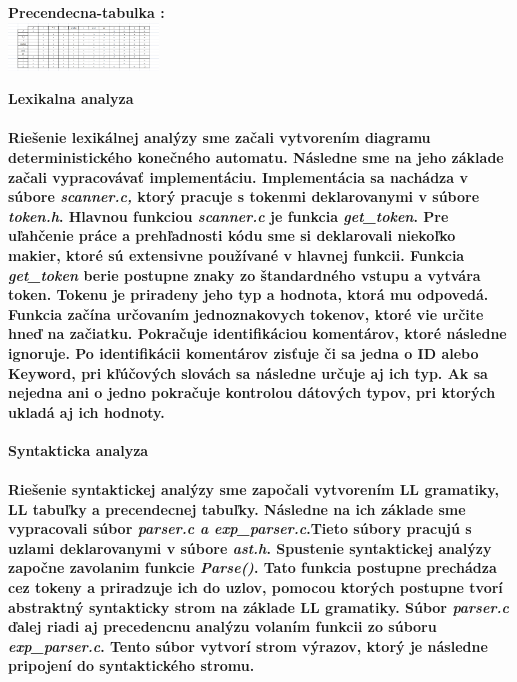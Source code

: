\documentclass[12pt]{article}
\begin{document}
 \Large \textbf{Precendecna-tabulka :}
\newline \\

\includegraphics[width=0.3\textwidth,scale=0.3]{Ptabulka}


\newpage

 \Large \textbf{Lexikalna analyza} \normalsize \\
\noindent\makebox[\linewidth]{\rule{\textwidth}{0.4pt}}

\paragraph{\indent Riešenie lexikálnej analýzy sme začali vytvorením diagramu deterministického konečného automatu. Následne sme na jeho základe začali vypracovávať implementáciu. Implementácia sa nachádza v súbore \textit{scanner.c,} ktorý pracuje s tokenmi deklarovanymi v súbore \textit{token.h}. Hlavnou funkciou \textit{scanner.c} je funkcia \textit{get\_token}. Pre uľahčenie práce a prehľadnosti kódu sme si deklarovali niekoľko makier, ktoré sú extensivne používané v hlavnej funkcii. Funkcia \textit{get\_token} berie postupne znaky zo štandardného vstupu a vytvára token. Tokenu je priradeny jeho typ a hodnota, ktorá mu odpovedá. Funkcia začína určovaním jednoznakovych tokenov, ktoré vie určite hneď na začiatku. Pokračuje identifikáciou komentárov, ktoré následne ignoruje. Po identifikácii komentárov zisťuje či sa jedna o ID alebo Keyword, pri kľúčových slovách sa následne určuje aj ich typ. Ak sa nejedna ani o jedno pokračuje kontrolou dátových typov, pri ktorých ukladá aj ich hodnoty.  \newline \\}

 \Large \textbf{Syntakticka analyza}\normalsize \\
\noindent\makebox[\linewidth]{\rule{\textwidth}{0.4pt}}

\paragraph{Riešenie syntaktickej analýzy sme započali vytvorením LL gramatiky, LL tabuľky a precendecnej tabuľky. Následne na ich základe sme vypracovali súbor \textit{parser.c a exp\_parser.c}.Tieto súbory pracujú s uzlami deklarovanymi v súbore \textit{ast.h}. Spustenie syntaktickej analýzy započne zavolanim funkcie \textit{Parse()}. Tato funkcia postupne prechádza cez tokeny a priradzuje ich do uzlov, pomocou ktorých postupne tvorí abstraktný syntakticky strom na základe LL gramatiky. Súbor \textit{parser.c} ďalej riadi aj precedencnu analýzu volaním funkcii zo súboru \textit{exp\_parser.c}. Tento súbor vytvorí strom výrazov, ktorý je následne pripojení do syntaktického stromu.  \newline \\}
\end{document}
